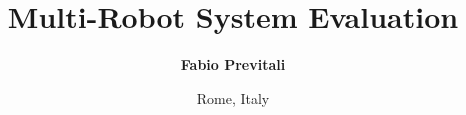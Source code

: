 \documentclass{beamer}
\title[Multi-Robot System Evaluation]{\Large Multi-Robot System Evaluation}
\subtitle{}
\author[Fabio Previtali]{\Large\textbf{Fabio Previtali}}
\date[January 31, 2013]{Rome, Italy}
\begin{document}
\begin{frame}[plain]
	\titlepage
\end{frame}

\Large



\begin{Large}





\end{Large}

\tiny


\end{document}
